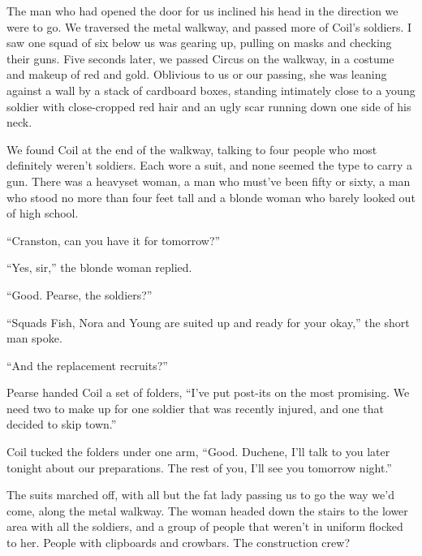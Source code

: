 The man who had opened the door for us inclined his head in the direction we were to go.  We traversed the metal walkway, and passed more of Coil's soldiers.  I saw one squad of six below us was gearing up, pulling on masks and checking their guns.  Five seconds later, we passed Circus on the walkway, in a costume and makeup of red and gold.  Oblivious to us or our passing, she was leaning against a wall by a stack of cardboard boxes, standing intimately close to a young soldier with close-cropped red hair and an ugly scar running down one side of his neck.



We found Coil at the end of the walkway, talking to four people who most definitely weren't soldiers.  Each wore a suit, and none seemed the type to carry a gun.  There was a heavyset woman, a man who must've been fifty or sixty, a man who stood no more than four feet tall and a blonde woman who barely looked out of high school.



``Cranston, can you have it for tomorrow?''



``Yes, sir,'' the blonde woman replied.



``Good.  Pearse, the soldiers?''



``Squads Fish, Nora and Young are suited up and ready for your okay,'' the short man spoke.



``And the replacement recruits?''



Pearse handed Coil a set of folders, ``I've put post-its on the most promising.  We need two to make up for one soldier that was recently injured, and one that decided to skip town.''



Coil tucked the folders under one arm, ``Good.  Duchene, I'll talk to you later tonight about our preparations.  The rest of you, I'll see you tomorrow night.''



The suits marched off, with all but the fat lady passing us to go the way we'd come, along the metal walkway.  The woman headed down the stairs to the lower area with all the soldiers, and a group of people that weren't in uniform flocked to her.  People with clipboards and crowbars.  The construction crew?



